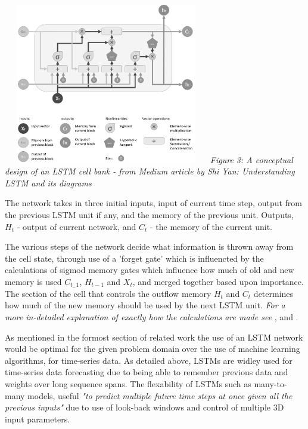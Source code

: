 \documentclass[oneside, 10pt]{article}
\begin{document}
			\begin{center}
				\includegraphics[width=9cm,height=7cm]{images/lstm.png}
				\newline
				\textit{Figure 3: A conceptual design of an LSTM cell bank - from Medium article by Shi Yan: Understanding LSTM and its diagrams}\cite{23}
			\end{center}
			
			The network takes in three initial inputs, input of current time step, output from the previous LSTM unit if any, and the memory of the previous unit. Outputs, $H_t$ - output of current network, and $C_t$ - the memory of the current unit. \cite{23}
			
			The various steps of the network decide what information is thrown away from the cell state, through use of a 'forget gate' which is influencted by the calculations of sigmod memory gates which influence how much of old and new memory is used $C_{t_-1}$, $H_{t-1}$
			and $X_t$, and merged together based upon importance. The section of the cell that controls the outflow memory $H_t$ and $C_t$ determines how much of the new memory should be used by the next LSTM unit. 
			\textit{For a more in-detailed explanation of exactly how the calculations are made see} \cite{22},\cite{23} and \cite{24}.
			
			As mentioned in the formost section of related work the use of an LSTM network would be optimal for the given problem domain over the use of machine learning algorithms, for time-series data. As detailed above, LSTMs are widley used for time-series data forecasting due to being able to remember previous data and weights over long sequence spans\cite{22}\cite{25}. The flexability of LSTMs such as many-to-many models, useful \textit{"to predict multiple future time steps at once given all the previous inputs"} due to use of look-back windows and control of multiple 3D input parameters.\cite{25}
			
\end{document}
